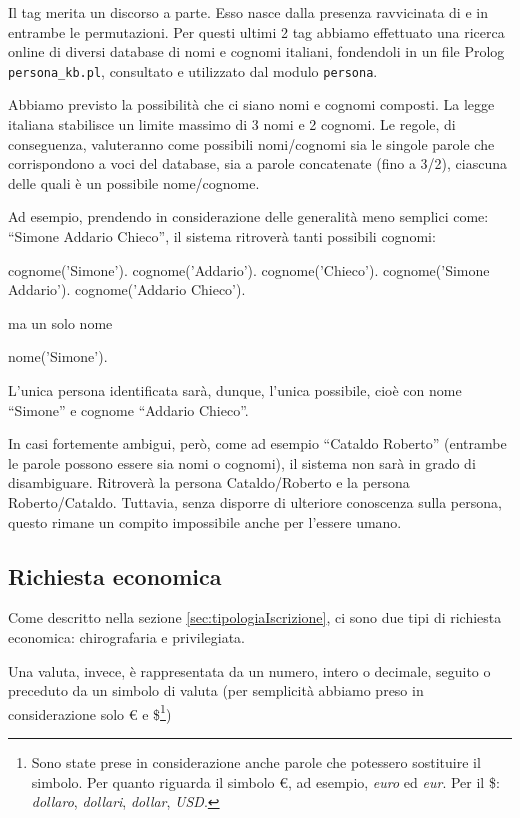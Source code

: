 Il tag  merita un discorso a parte.
Esso nasce dalla presenza ravvicinata di  e  in entrambe le permutazioni.
Per questi ultimi 2 tag abbiamo effettuato una ricerca online di diversi database di nomi e cognomi italiani, fondendoli in un file Prolog \verb|persona_kb.pl|, consultato e utilizzato dal modulo \verb|persona|.

Abbiamo previsto la possibilità che ci siano nomi e cognomi composti. La legge italiana stabilisce un limite massimo di 3 nomi e 2 cognomi.
Le regole, di conseguenza, valuteranno come possibili nomi/cognomi sia le singole parole che corrispondono a voci del database, sia a parole concatenate (fino a 3/2), ciascuna delle quali è un possibile nome/cognome.

Ad esempio, prendendo in considerazione delle generalità meno semplici come: ``Simone Addario Chieco'', il sistema ritroverà tanti possibili cognomi:

\begin{prologcode}
cognome('Simone').
cognome('Addario').
cognome('Chieco').
cognome('Simone Addario').
cognome('Addario Chieco').
\end{prologcode}

ma un solo nome

\begin{prologcode}
nome('Simone').
\end{prologcode}

L'unica persona identificata sarà, dunque, l'unica possibile, cioè con nome ``Simone'' e cognome ``Addario Chieco''.

In casi fortemente ambigui, però, come ad esempio ``Cataldo Roberto'' (entrambe le parole possono essere sia nomi o cognomi), il sistema non sarà in grado di disambiguare. Ritroverà la persona Cataldo/Roberto e la persona Roberto/Cataldo. Tuttavia, senza disporre di ulteriore conoscenza sulla persona, questo rimane un compito impossibile anche per l'essere umano.

\subsection{Richiesta economica}

Come descritto nella sezione \ref{sec:tipologiaIscrizione}, ci sono due tipi di richiesta economica: chirografaria e privilegiata.

Una valuta, invece, è rappresentata da un numero, intero o decimale, seguito o preceduto da un simbolo di valuta (per semplicità abbiamo preso in considerazione solo € e \$\footnote{Sono state prese in considerazione anche parole che potessero sostituire il simbolo. Per quanto riguarda il simbolo €, ad esempio, \emph{euro} ed \emph{eur}. Per il \$: \emph{dollaro}, \emph{dollari}, \emph{dollar}, \emph{USD}.})

